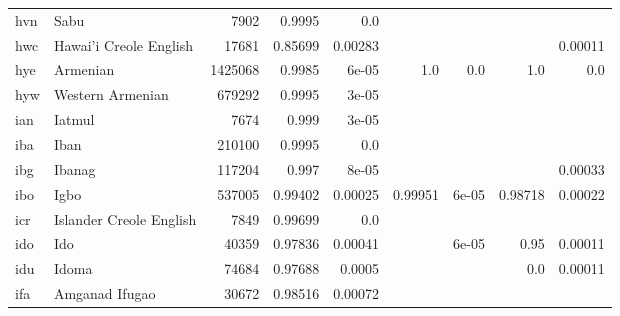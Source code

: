 \documentclass[11pt]{article}
\begin{document}
\begin{table*}[h]
{\begin{tabular}{llrrrrrrr}
hvn         & Sabu         & 7902         & 0.9995         & 0.0         &          &          &          &          \\

hwc         & Hawai'i Creole English         & 17681         & 0.85699         & 0.00283         &          &          &          & 0.00011         \\

hye         & Armenian         & 1425068         & 0.9985         & 6e-05         & 1.0         & 0.0         & 1.0         & 0.0         \\

hyw         & Western Armenian         & 679292         & 0.9995         & 3e-05         &          &          &          &          \\

ian         & Iatmul         & 7674         & 0.999         & 3e-05         &          &          &          &          \\

iba         & Iban         & 210100         & 0.9995         & 0.0         &          &          &          &          \\

ibg         & Ibanag         & 117204         & 0.997         & 8e-05         &          &          &          & 0.00033         \\

ibo         & Igbo         & 537005         & 0.99402         & 0.00025         & 0.99951         & 6e-05         & 0.98718         & 0.00022         \\

icr         & Islander Creole English         & 7849         & 0.99699         & 0.0         &          &          &          &          \\

ido         & Ido         & 40359         & 0.97836         & 0.00041         &          & 6e-05         & 0.95         & 0.00011         \\

idu         & Idoma         & 74684         & 0.97688         & 0.0005         &          &          & 0.0         & 0.00011         \\

ifa         & Amganad Ifugao         & 30672         & 0.98516         & 0.00072         &          &          &          &          \\


\end{tabular}}
\end{table*}
\end{document}
